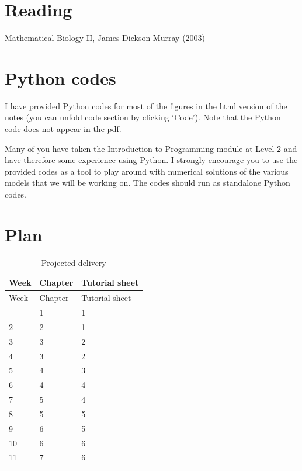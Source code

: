 \documentclass[
  letterpaper,
  DIV=11,
  numbers=noendperiod]{scrreprt}
\theoremstyle{plain}
\theoremstyle{definition}
\theoremstyle{plain}
\theoremstyle{remark}
\begin{document}
\hypertarget{reading}{%
\section*{Reading}\label{reading}}


Mathematical Biology II, James Dickson Murray (2003)

\hypertarget{python-codes}{%
\section*{Python codes}\label{python-codes}}


I have provided Python codes for most of the figures in the html version
of the notes (you can unfold code section by clicking `Code'). Note that
the Python code does not appear in the pdf.

Many of you have taken the Introduction to Programming module at Level 2
and have therefore some experience using Python. I strongly encourage
you to use the provided codes as a tool to play around with numerical
solutions of the various models that we will be working on. The codes
should run as standalone Python codes.

\hypertarget{plan}{%
\section*{Plan}\label{plan}}


\begin{longtable}[]{@{}lll@{}}
\caption{Projected delivery}\tabularnewline
\toprule\noalign{}
Week & Chapter & Tutorial sheet \\
\midrule\noalign{}
\endfirsthead
\toprule\noalign{}
Week & Chapter & Tutorial sheet \\
\midrule\noalign{}
\endhead
\bottomrule\noalign{}
\endlastfoot
1 & 1 & 1 \\
2 & 2 & 1 \\
3 & 3 & 2 \\
4 & 3 & 2 \\
5 & 4 & 3 \\
6 & 4 & 4 \\
7 & 5 & 4 \\
8 & 5 & 5 \\
9 & 6 & 5 \\
10 & 6 & 6 \\
11 & 7 & 6 \\
\end{longtable}
\end{document}
